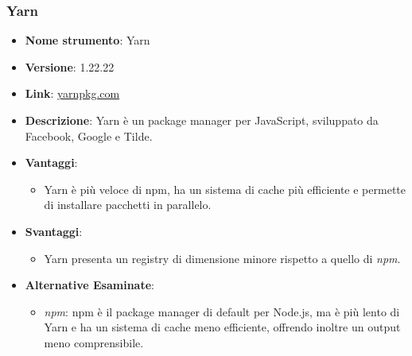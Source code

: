 \subsubsection{Yarn}
\begin{itemize}
      \item \textbf{Nome strumento}: Yarn
      \item \textbf{Versione}: 1.22.22
      \item \textbf{Link}: \href{https://yarnpkg.com/}{yarnpkg.com}
      \item \textbf{Descrizione}: Yarn è un package manager per JavaScript, sviluppato da Facebook, Google e Tilde.
      \item \textbf{Vantaggi}:
            \begin{itemize}
                  \item Yarn è più veloce di npm, ha un sistema di cache più efficiente e permette di installare pacchetti in parallelo.
            \end{itemize}
      \item \textbf{Svantaggi}:
            \begin{itemize}
                  \item Yarn presenta un registry di dimensione minore rispetto a quello di \textit{npm}.
            \end{itemize}
      \item \textbf{Alternative Esaminate}:
            \begin{itemize}
                  \item \textit{npm}: npm è il package manager di default per Node.js, ma è più lento di Yarn e ha un sistema di cache meno efficiente,
                        offrendo inoltre un output meno comprensibile.
            \end{itemize}
\end{itemize}

